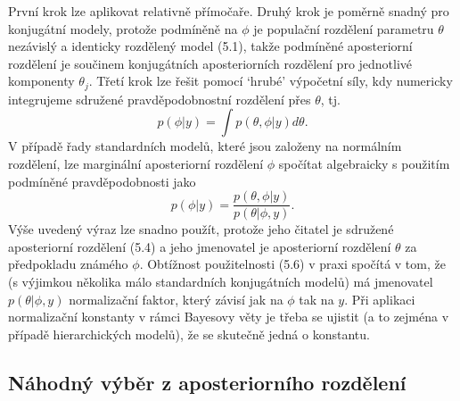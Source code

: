 První krok lze aplikovat relativně přímočaře. Druhý krok je poměrně snadný pro konjugátní modely, protože podmíněně na $\phi$ je populační rozdělení parametru $\theta$ nezávislý a identicky rozdělený model (5.1), takže podmíněné aposteriorní rozdělení je součinem konjugátních aposteriorních rozdělení pro jednotlivé komponenty $\theta_j$. Třetí krok lze řešit pomocí `hrubé' výpočetní síly, kdy numericky integrujeme sdružené pravděpodobnostní rozdělení přes $\theta$, tj.
\begin{equation}
p(\phi | y) = \int p(\theta, \phi | y) d \theta.
\end{equation}
V případě řady standardních modelů, které jsou založeny na normálním rozdělení, lze marginální aposteriorní rozdělení $\phi$ spočítat algebraicky s použitím podmíněné pravděpodobnosti jako
\begin{equation}
p(\phi | y) = \frac{p(\theta, \phi | y)}{p(\theta | \phi, y)}.
\end{equation}
Výše uvedený výraz lze snadno použít, protože jeho čitatel je sdružené aposteriorní rozdělení (5.4) a jeho jmenovatel je aposteriorní rozdělení $\theta$ za předpokladu známého $\phi$. Obtížnost použitelnosti (5.6) v praxi spočítá v tom, že (s výjimkou několika málo standardních konjugátních modelů) má jmenovatel $p(\theta | \phi, y)$ normalizační faktor, který závisí jak na $\phi$ tak na $y$. Při aplikaci normalizační konstanty v rámci Bayesovy věty je třeba se ujistit (a to zejména v případě hierarchických modelů), že se skutečně jedná o konstantu.

\subsection{Náhodný výběr z aposteriorního rozdělení}

